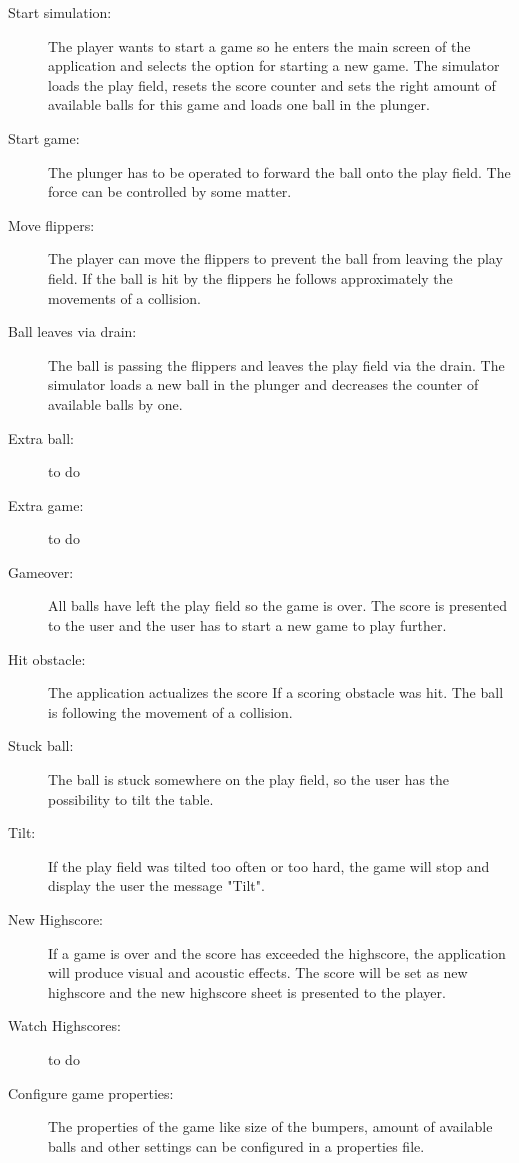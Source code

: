 \documentclass[fontsize=12pt,
               paper=a4,
               twoside=false,
               parskip=half,
               ]{scrartcl}
\begin{document}
\begin{description}

\item[Start simulation:]   The player wants to start a game so he enters the main screen of the application and selects the option for starting a new game. The simulator loads the play field, resets the score counter and sets the right amount of available balls for this game and loads one ball in the plunger.

\item[Start game:] The plunger has to be operated to forward the ball onto the play field.  The force can be controlled by some matter.

\item[Move flippers:] The player can move the flippers to prevent the ball from leaving the play field. If the ball is hit by the flippers he follows approximately the movements of a collision.

\item[Ball leaves via drain:] The ball is passing the flippers and leaves the play field via the drain. The simulator loads a new ball in the plunger and decreases the counter of available balls by one.

\item[Extra ball:] 
to do

\item[Extra game:]
to do

\item[Gameover:] All balls have left the play field so the game is over. The score is presented to the user and the user has to start a new game to play further.

\item[Hit obstacle:] The application actualizes the score If a scoring obstacle  was hit. The ball is following the movement of a collision.

\item[Stuck ball:] The ball is stuck somewhere on the play field, so the user has the possibility to tilt the table.

\item[Tilt:] If the play field was tilted too often or too hard, the game will stop and display the user the message "Tilt".

\item[New Highscore:] If a game is over and the score has exceeded the highscore, the application will produce visual and acoustic effects. The score will be set as new highscore and the new highscore sheet is presented to the player.

\item[Watch Highscores:] 
to do

\item[Configure game properties:] The properties of the game like size of the bumpers, amount of available balls and other settings can be configured in a properties file.

\end{description}
\end{document}
